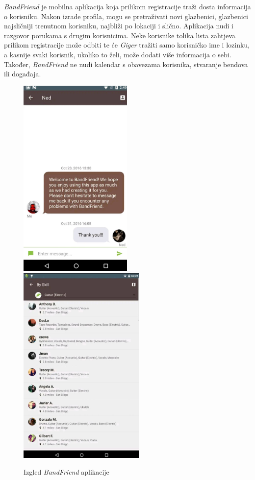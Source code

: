 		\textit{BandFriend} je mobilna aplikacija koja prilikom registracije traži dosta informacija o korisniku. Nakon izrade profila, mogu se pretraživati novi glazbenici, glazbenici najsličniji trenutnom korisniku, najbliži po lokaciji i slično. Aplikacija nudi i razgovor porukama s drugim korisnicima. Neke korisnike tolika lista zahtjeva prilikom registracije može odbiti te će \textit{Giger} tražiti samo korisničko ime i lozinku, a kasnije svaki korisnik, ukoliko to želi, može dodati više informacija o sebi. Također, \textit{BandFriend} ne nudi kalendar s obavezama korisnika, stvaranje bendova ili događaja.
		\\
		
		\begin{figure}[H]
			\begin{center}
				\includegraphics[height=10cm]{slike/BandFriend.JPEG}
				\includegraphics[height=10cm]{slike/BandFriend2.JPEG}
			\end{center}
			\caption{Izgled \textit{BandFriend} aplikacije}
			\label{fig:promjene3}
		\end{figure}
		 
